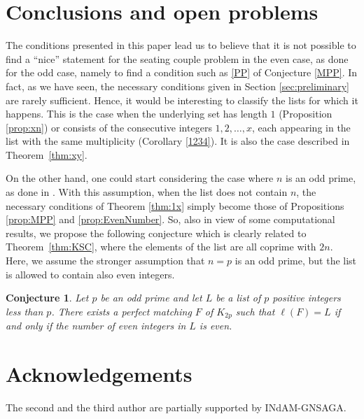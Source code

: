 \documentclass{amsart}
\newtheorem{conj}{Conjecture}
\theoremstyle{definition}
\numberwithin{equation}{section}
\begin{document}
\section{Conclusions and open problems}

The conditions presented in this paper lead us to believe that it is not possible
to find a ``nice'' statement for the seating couple problem in the even case, as done for the odd case,
namely to find a condition such as \eqref{PP} of Conjecture \ref{MPP}.
In fact, as we have seen, the necessary conditions given in Section \ref{sec:preliminary}
are rarely sufficient. Hence, it would be interesting to classify the lists for which it happens.
This is the case when the underlying set has length $1$ (Proposition \ref{prop:xn})
or consists of the consecutive integers $1,2,\ldots,x$,
each appearing in the list with the same multiplicity (Corollary \ref{1234}).
It is also the case described in Theorem~\ref{thm:xy}.

On the other hand, one could start considering the case where $n$ is an odd prime, as done in \cite{M}.
With this assumption, when the list does not contain $n$,  the necessary conditions of Theorem \ref{thm:1x} simply become those of Propositions \ref{prop:MPP} and \ref{prop:EvenNumber}. So, also in view of some computational results, we propose the following
conjecture which is clearly related to Theorem~\ref{thm:KSC}, where the elements of the list are all coprime with $2n$.
Here, we assume the stronger assumption that $n=p$ is an odd prime, but the list is allowed to contain 
also even integers.


\begin{conj}\label{conj:3}
Let $p$ be an odd prime and let $L$ be a list of $p$ positive integers less than $p$.
There exists a perfect matching $F$ of $K_{2p}$ such that $\ell(F) = L$ if and only if the number of even
integers in $L$ is even.
\end{conj}


\section*{Acknowledgements}
The second and the third author are partially supported by INdAM-GNSAGA.
\end{document}
